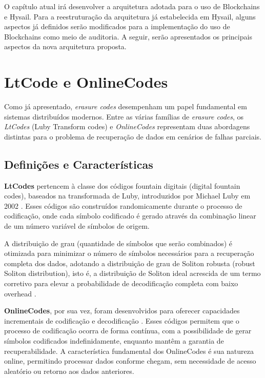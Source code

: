 O capítulo atual irá desenvolver a arquitetura adotada para o uso de Blockchains e Hysail. Para a reestruturação da arquitetura já estabelecida
em Hysail, alguns aspectos já definidos serão modificados para a implementação do uso de Blockchains como meio de auditoria. A seguir, serão
apresentados os principais aspectos da nova arquitetura proposta.

\section{LtCode e OnlineCodes}

Como já apresentado, \emph{erasure codes} desempenham um papel fundamental em sistemas distribuídos modernos. Entre as várias famílias de \emph{erasure codes}, os \emph{LtCodes} (Luby Transform codes) e \emph{OnlineCodes} representam duas abordagens distintas para o problema de recuperação de dados em cenários de falhas parciais.

\subsection{Definições e Características}

\textbf{LtCodes} pertencem à classe dos códigos fountain digitais (digital fountain codes), baseados na transformada de Luby, introduzidos por Michael Luby em 2002 \cite{luby2002lt}. Esses códigos são construídos randomicamente durante o processo de codificação, onde cada símbolo codificado é gerado através da combinação linear de um número variável de símbolos de origem.

A distribuição de grau (quantidade de símbolos que serão combinados) é otimizada para minimizar o número de símbolos necessários para a recuperação completa dos dados, adotando a distribuição de grau de Soliton robusta (robust Soliton distribution), isto é, a distribuição de Soliton ideal acrescida de um termo corretivo para elevar a probabilidade de decodificação completa com baixo overhead \cite{shokrollahi2006raptor}.

\textbf{OnlineCodes}, por sua vez, foram desenvolvidos para oferecer capacidades incrementais de codificação e decodificação \cite{maymounkov2002online}. Esses códigos permitem que o processo de codificação ocorra de forma contínua, com a possibilidade de gerar símbolos codificados indefinidamente, enquanto mantêm a garantia de recuperabilidade. A característica fundamental dos OnlineCodes é sua natureza online, permitindo processar dados conforme chegam, sem necessidade de acesso aleatório ou retorno aos dados anteriores.

